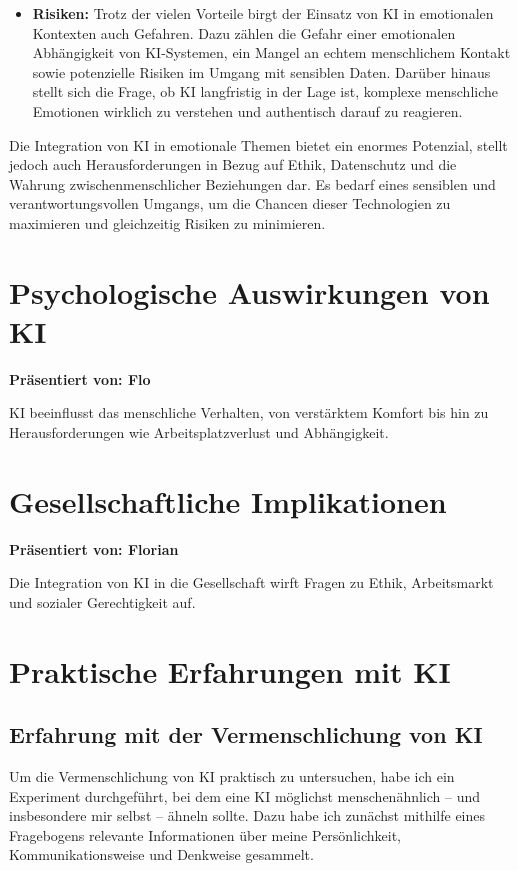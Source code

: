 \documentclass[a4paper,12pt]{article}
\begin{document}
\begin{itemize}
\item \textbf{Risiken:}  
Trotz der vielen Vorteile birgt der Einsatz von KI in emotionalen Kontexten auch Gefahren. Dazu zählen die Gefahr einer emotionalen Abhängigkeit von KI-Systemen, ein Mangel an echtem menschlichem Kontakt sowie potenzielle Risiken im Umgang mit sensiblen Daten. Darüber hinaus stellt sich die Frage, ob KI langfristig in der Lage ist, komplexe menschliche Emotionen wirklich zu verstehen und authentisch darauf zu reagieren.
\end{itemize}

Die Integration von KI in emotionale Themen bietet ein enormes Potenzial, stellt jedoch auch Herausforderungen in Bezug auf Ethik, Datenschutz und die Wahrung zwischenmenschlicher Beziehungen dar. Es bedarf eines sensiblen und verantwortungsvollen Umgangs, um die Chancen dieser Technologien zu maximieren und gleichzeitig Risiken zu minimieren.

\section{Psychologische Auswirkungen von KI}
\textbf{Präsentiert von: Flo}

KI beeinflusst das menschliche Verhalten, von verstärktem Komfort bis hin zu Herausforderungen wie Arbeitsplatzverlust und Abhängigkeit.

\section{Gesellschaftliche Implikationen}
\textbf{Präsentiert von: Florian}

Die Integration von KI in die Gesellschaft wirft Fragen zu Ethik, Arbeitsmarkt und sozialer Gerechtigkeit auf.

\section{Praktische Erfahrungen mit KI}

\subsection{Erfahrung mit der Vermenschlichung von KI}

Um die Vermenschlichung von KI praktisch zu untersuchen, habe ich ein Experiment durchgeführt, bei dem eine KI möglichst menschenähnlich – und insbesondere mir selbst – ähneln sollte. Dazu habe ich zunächst mithilfe eines Fragebogens relevante Informationen über meine Persönlichkeit, Kommunikationsweise und Denkweise gesammelt.
\end{document}
